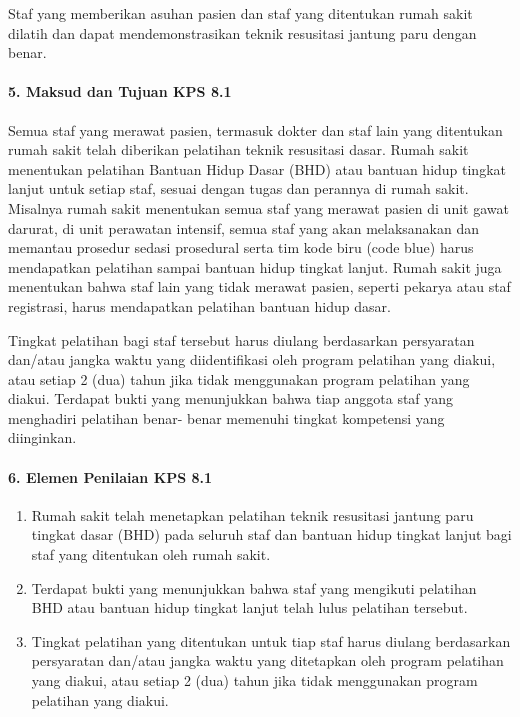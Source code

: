 \documentclass[
]{book}
\providecommand{\tightlist}{%
  \setlength{\itemsep}{0pt}\setlength{\parskip}{0pt}}
\begin{document}
Staf yang memberikan asuhan pasien dan staf yang ditentukan rumah sakit dilatih dan dapat mendemonstrasikan teknik resusitasi jantung paru dengan benar.

\hypertarget{maksud-dan-tujuan-kps-8.1}{%
\paragraph*{5. Maksud dan Tujuan KPS 8.1}\label{maksud-dan-tujuan-kps-8.1}}

Semua staf yang merawat pasien, termasuk dokter dan staf lain yang ditentukan rumah sakit telah diberikan pelatihan teknik resusitasi dasar. Rumah sakit menentukan pelatihan Bantuan Hidup Dasar (BHD) atau bantuan hidup tingkat lanjut untuk setiap staf, sesuai dengan tugas dan perannya di rumah sakit. Misalnya rumah sakit menentukan semua staf yang merawat pasien di unit gawat darurat, di unit perawatan intensif, semua staf yang akan melaksanakan dan memantau prosedur sedasi prosedural serta tim kode biru (code blue) harus mendapatkan pelatihan sampai bantuan hidup tingkat lanjut. Rumah sakit juga menentukan bahwa staf lain yang tidak merawat pasien, seperti pekarya atau staf registrasi, harus mendapatkan pelatihan bantuan hidup dasar.

Tingkat pelatihan bagi staf tersebut harus diulang berdasarkan persyaratan dan/atau jangka waktu yang diidentifikasi oleh program pelatihan yang diakui, atau setiap 2 (dua) tahun jika tidak menggunakan program pelatihan yang diakui. Terdapat bukti yang menunjukkan bahwa tiap anggota staf yang menghadiri pelatihan benar- benar memenuhi tingkat kompetensi yang diinginkan.

\hypertarget{elemen-penilaian-kps-8.1}{%
\paragraph*{6. Elemen Penilaian KPS 8.1}\label{elemen-penilaian-kps-8.1}}

\begin{enumerate}
\def\labelenumi{\alph{enumi}.}
\tightlist
\item
  Rumah sakit telah menetapkan pelatihan teknik resusitasi jantung paru tingkat dasar (BHD) pada seluruh staf dan bantuan hidup tingkat lanjut bagi staf yang ditentukan oleh rumah sakit.
\item
  Terdapat bukti yang menunjukkan bahwa staf yang mengikuti pelatihan BHD atau bantuan hidup tingkat lanjut telah lulus pelatihan tersebut.
\item
  Tingkat pelatihan yang ditentukan untuk tiap staf harus diulang berdasarkan persyaratan dan/atau jangka waktu yang ditetapkan oleh program pelatihan yang diakui, atau setiap 2 (dua) tahun jika tidak menggunakan program pelatihan yang diakui.
\end{enumerate}
\end{document}
